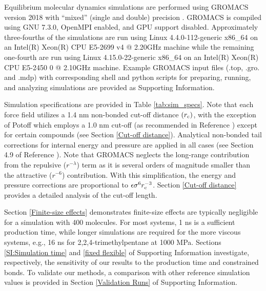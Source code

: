 \documentclass[preprint,review,12pt]{elsarticle}
\begin{document}
	Equilibrium molecular dynamics simulations are performed using GROMACS version 2018 with ``mixed'' (single and double) precision \cite{GROMACS_2018}. GROMACS is compiled using GNU 7.3.0, OpenMPI enabled, and GPU support disabled. Approximately three-fourths of the simulations are run using Linux 4.4.0-112-generic x86\_64 on an Intel(R) Xeon(R) CPU E5-2699 v4 @ 2.20GHz machine while the remaining one-fourth are run using Linux 4.15.0-22-generic x86\_64 on an Intel(R) Xeon(R) CPU E5-2450 0 @ 2.10GHz machine. Example GROMACS input files (.top, .gro. and .mdp) with corresponding shell and python scripts for preparing, running, and analyzing simulations are provided as Supporting Information. 
	
	
	Simulation specifications are provided in Table \ref{tab:sim_specs}. Note that each force field utilizes a 1.4 nm non-bonded cut-off distance $(r_{\rm c})$, with the exception of Potoff which employs a 1.0 nm cut-off (as recommended in Reference ) except for certain compounds (see Section \ref{Cut-off distance}). Analytical non-bonded tail corrections for internal energy and pressure are applied in all cases (see Section 4.9 of Reference \cite{GROMACS_2018}). Note that GROMACS neglects the long-range contribution from the repulsive ($r^{-\lambda}$) term as it is several orders of magnitude smaller than the attractive ($r^{-6}$) contribution. With this simplification, the energy and pressure corrections are proportional to $\epsilon \sigma^6 r_{\rm c}^{-3}$. Section \ref{Cut-off distance} provides a detailed analysis of the cut-off length. 
	
	
	Section \ref{Finite-size effects} demonstrates finite-size effects are typically negligible for a simulation with 400 molecules. For most systems, 1 ns is a sufficient production time, while longer simulations are required for the more viscous systems, e.g., 16 ns for 2,2,4-trimethylpentane at 1000 MPa. Sections \ref{SI:Simulation time} and \ref{fixed flexible} of Supporting Information investigate, respectively, the sensitivity of our results to the production time and constrained bonds. To validate our methods, a comparison with other reference simulation values \cite{NIST_SRSW,Kioupis2000,Nieto2006} is provided in Section \ref{Validation Runs} of Supporting Information.  
\end{document}
